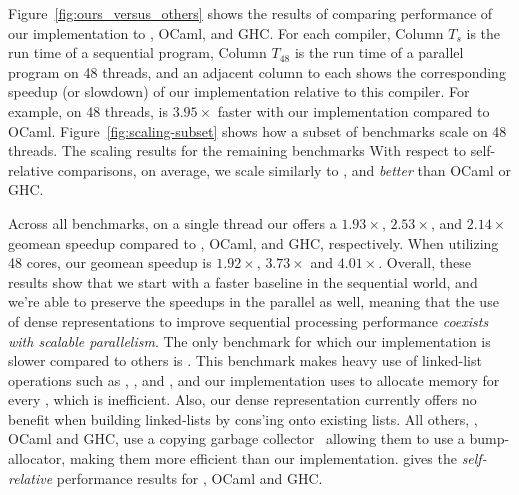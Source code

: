 \documentclass[acmsmall,acmthm=false,nonacm]{acmart}
\theoremstyle{straighttext0}
\theoremstyle{straighttext}
\newcommand{\Figref}[1]{Figure~\ref{#1}}
\newcommand{\new}[1]{#1}
\begin{document}
{\Figref{fig:ours_versus_others} shows the results of comparing performance of
our implementation to \MPL, OCaml, and GHC.
%
For each compiler, Column $T_s$ is the run time of a sequential program,
Column $T_{48}$ is the run time of a parallel program on 48 threads,
and an adjacent column to each shows the corresponding speedup (or slowdown) of our implementation
relative to this compiler.
%
For example, on 48 threads,  is $3.95\times$ faster with our
implementation compared to OCaml.
%
\Figref{fig:scaling-subset} shows how a subset of benchmarks scale on 48 threads.
%
The scaling results for the remaining benchmarks
\iftoggle{EXTND}{
  are available in Appendix~\ref{sec:appendix-evaluation}.
}{
  are available in the Appendix of the extended version~\cite{ParallelLoCal-tr}.
}
%
With respect to self-relative comparisons,
on average, we scale similarly to \MPL{}, and {\em better} than OCaml or GHC.

Across all benchmarks,
on a single thread our \pargibbon{} offers a $1.93\times$, $2.53\times$, and $2.14\times$ geomean speedup compared to \MPL{}, OCaml, and GHC, respectively.
%
When utilizing 48 cores, our geomean speedup is $1.92\times$, $3.73\times$ and $4.01\times$.
%
Overall,
these results show that we start with a faster baseline in the sequential world,
and we're able to preserve the speedups in the parallel as well,
meaning that the use of dense representations
to improve sequential processing performance {\em coexists with scalable parallelism}.
%
The only benchmark for which our implementation is slower compared to others is .
%
This benchmark makes heavy use of linked-list operations
such as , , and ,
and our implementation uses  to allocate memory
for every , which is inefficient.
%
Also, our dense representation currently offers no benefit when building
linked-lists by cons'ing onto existing lists.
%
All others, \MPL{}, OCaml and GHC, use a copying garbage collector~\cite{sivaramakrishnan2020retrofitting,MPL,marlow08_gc} allowing them to use a bump-allocator,
making them more efficient than our implementation.
%
%
\iftoggle{EXTND}{
  \Figref{fig:others-benchmark-results} in Appendix
}{
  Figure~15 in the Appendix of the extended version~\cite{ParallelLoCal-tr}
}
gives the {\em self-relative} performance
results for \MPL{}, OCaml and GHC.


}
\end{document}
